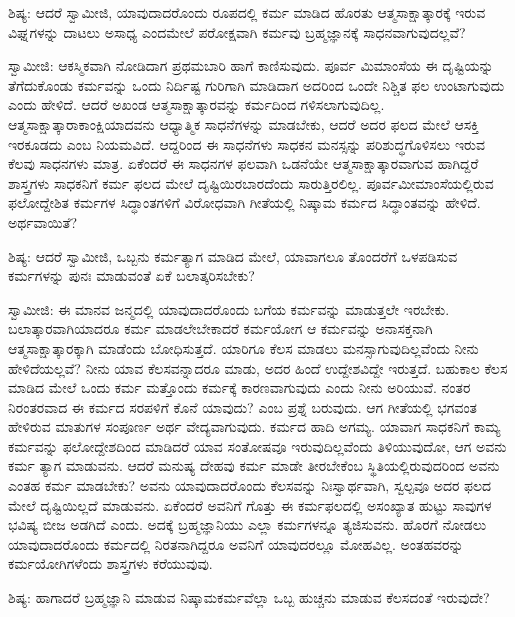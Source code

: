 ಶಿಷ್ಯ: ಆದರೆ ಸ್ವಾಮೀಜಿ, ಯಾವುದಾದರೊಂದು ರೂಪದಲ್ಲಿ ಕರ್ಮ ಮಾಡಿದ ಹೊರತು ಆತ್ಮಸಾಕ್ಷಾತ್ಕಾರಕ್ಕೆ ಇರುವ ವಿಘ್ನಗಳನ್ನು ದಾಟಲು ಅಸಾಧ್ಯ ಎಂದಮೇಲೆ ಪರೋಕ್ಷವಾಗಿ ಕರ್ಮವು ಬ್ರಹ್ಮಜ್ಞಾನಕ್ಕೆ ಸಾಧನವಾಗುವುದಲ್ಲವೆ?

ಸ್ವಾಮೀಜಿ: ಆಕಸ್ಮಿಕವಾಗಿ ನೋಡಿದಾಗ ಪ್ರಥಮಬಾರಿ ಹಾಗೆ ಕಾಣಿಸುವುದು. ಪೂರ್ವ ಮಿಮಾಂಸೆಯ ಈ ದೃಷ್ಟಿಯನ್ನು ತೆಗೆದುಕೊಂಡು ಕರ್ಮವನ್ನು ಒಂದು ನಿರ್ದಿಷ್ಟ ಗುರಿಗಾಗಿ ಮಾಡಿದಾಗ ಅದರಿಂದ ಒಂದೇ ನಿಶ್ಚಿತ ಫಲ ಉಂಟಾಗುವುದು ಎಂದು ಹೇಳಿದೆ. ಆದರೆ ಅಖಂಡ ಆತ್ಮಸಾಕ್ಷಾತ್ಕಾರವನ್ನು ಕರ್ಮದಿಂದ ಗಳಿಸಲಾಗುವುದಿಲ್ಲ. ಆತ್ಮಸಾಕ್ಷಾತ್ಕಾರಾಕಾಂಕ್ಷಿಯಾದವನು ಆಧ್ಯಾತ್ಮಿಕ ಸಾಧನೆಗಳನ್ನು ಮಾಡಬೇಕು, ಆದರೆ ಅದರ ಫಲದ ಮೇಲೆ ಆಸಕ್ತಿ ಇರಕೂಡದು ಎಂಬ ನಿಯಮವಿದೆ. ಆದ್ದರಿಂದ ಈ ಸಾಧನೆಗಳು ಸಾಧಕನ ಮನಸ್ಸನ್ನು ಪರಿಶುದ್ಧಗೊಳಿಸಲು ಇರುವ ಕೆಲವು ಸಾಧನಗಳು ಮಾತ್ರ. ಏಕೆಂದರೆ ಈ ಸಾಧನಗಳ ಫಲವಾಗಿ ಒಡನೆಯೇ ಆತ್ಮಸಾಕ್ಷಾತ್ಕಾರವಾಗುವ ಹಾಗಿದ್ದರೆ ಶಾಸ್ತ್ರಗಳು ಸಾಧಕನಿಗೆ ಕರ್ಮ ಫಲದ ಮೇಲೆ ದೃಷ್ಟಿಯಿರಬಾರದೆಂದು ಸಾರುತ್ತಿರಲಿಲ್ಲ. ಪೂರ್ವಮೀಮಾಂಸೆಯಲ್ಲಿರುವ ಫಲೋದ್ದೇಶಿತ ಕರ್ಮಗಳ ಸಿದ್ಧಾಂತಗಳಿಗೆ ವಿರೋಧವಾಗಿ ಗೀತೆಯಲ್ಲಿ ನಿಷ್ಕಾಮ ಕರ್ಮದ ಸಿದ್ಧಾಂತವನ್ನು ಹೇಳಿದೆ. ಅರ್ಥವಾಯಿತೆ?

ಶಿಷ್ಯ: ಆದರೆ ಸ್ವಾಮೀಜಿ, ಒಬ್ಬನು ಕರ್ಮತ್ಯಾಗ ಮಾಡಿದ ಮೇಲೆ, ಯಾವಾಗಲೂ ತೊಂದರೆಗೆ ಒಳಪಡಿಸುವ ಕರ್ಮಗಳನ್ನು ಪುನಃ ಮಾಡುವಂತೆ ಏಕೆ ಬಲಾತ್ಕರಿಸಬೇಕು?

ಸ್ವಾಮೀಜಿ: ಈ ಮಾನವ ಜನ್ಮದಲ್ಲಿ ಯಾವುದಾದರೊಂದು ಬಗೆಯ ಕರ್ಮವನ್ನು ಮಾಡುತ್ತಲೇ ಇರಬೇಕು. ಬಲಾತ್ಕಾರವಾಗಿಯಾದರೂ ಕರ್ಮ ಮಾಡಲೇಬೇಕಾದರೆ ಕರ್ಮಯೋಗ ಆ ಕರ್ಮವನ್ನು ಅನಾಸಕ್ತನಾಗಿ ಆತ್ಮಸಾಕ್ಷಾತ್ಕಾರಕ್ಕಾಗಿ ಮಾಡೆಂದು ಬೋಧಿಸುತ್ತದೆ. ಯಾರಿಗೂ ಕೆಲಸ ಮಾಡಲು ಮನಸ್ಸಾಗುವುದಿಲ್ಲವೆಂದು ನೀನು ಹೇಳಿದೆಯಲ್ಲವೆ? ನೀನು ಯಾವ ಕೆಲಸವನ್ನಾದರೂ ಮಾಡು, ಅದರ ಹಿಂದೆ ಉದ್ದೇಶವಿದ್ದೇ ಇರುತ್ತದೆ. ಬಹುಕಾಲ ಕೆಲಸ ಮಾಡಿದ ಮೇಲೆ ಒಂದು ಕರ್ಮ ಮತ್ತೊಂದು ಕರ್ಮಕ್ಕೆ ಕಾರಣವಾಗುವುದು ಎಂದು ನೀನು ಅರಿಯುವೆ. ನಂತರ ನಿರಂತರವಾದ ಈ ಕರ್ಮದ ಸರಪಳಿಗೆ ಕೊನೆ ಯಾವುದು? ಎಂಬ ಪ್ರಶ್ನೆ ಬರುವುದು. ಆಗ ಗೀತೆಯಲ್ಲಿ ಭಗವಂತ ಹೇಳಿರುವ ಮಾತುಗಳ ಸಂಪೂರ್ಣ ಅರ್ಥ ವೇದ್ಯವಾಗುವುದು. ಕರ್ಮದ ಹಾದಿ ಅಗಮ್ಯ. ಯಾವಾಗ ಸಾಧಕನಿಗೆ ಕಾಮ್ಯ ಕರ್ಮವನ್ನು ಫಲೋದ್ದೇಶದಿಂದ ಮಾಡಿದರೆ ಯಾವ ಸಂತೋಷವೂ ಇರುವುದಿಲ್ಲವೆಂದು ತಿಳಿಯುವುದೋ, ಆಗ ಅವನು ಕರ್ಮ ತ್ಯಾಗ ಮಾಡುವನು. ಆದರೆ ಮನುಷ್ಯ ದೇಹವು ಕರ್ಮ ಮಾಡೇ ತೀರಬೇಕೆಂಬ ಸ್ಥಿತಿಯಲ್ಲಿರುವುದರಿಂದ ಅವನು ಎಂತಹ ಕರ್ಮ ಮಾಡಬೇಕು? ಅವನು ಯಾವುದಾದರೊಂದು ಕೆಲಸವನ್ನು ನಿಃಸ್ವಾರ್ಥವಾಗಿ, ಸ್ವಲ್ಪವೂ ಅದರ ಫಲದ ಮೇಲೆ ದೃಷ್ಟಿಯಿಲ್ಲದೆ ಮಾಡುವನು. ಏಕೆಂದರೆ ಅವನಿಗೆ ಗೊತ್ತು ಈ ಕರ್ಮಫಲದಲ್ಲಿ ಅಸಂಖ್ಯಾತ ಹುಟ್ಟು ಸಾವುಗಳ ಭವಿಷ್ಯ ಬೀಜ ಅಡಗಿದೆ ಎಂದು. ಅದಕ್ಕೆ ಬ್ರಹ್ಮಜ್ಞಾನಿಯು ಎಲ್ಲಾ ಕರ್ಮಗಳನ್ನೂ ತ್ಯಜಿಸುವನು. ಹೊರಗೆ ನೋಡಲು ಯಾವುದಾದರೊಂದು ಕರ್ಮದಲ್ಲಿ ನಿರತನಾಗಿದ್ದರೂ ಅವನಿಗೆ ಯಾವುದರಲ್ಲೂ ಮೋಹವಿಲ್ಲ. ಅಂತಹವರನ್ನು ಕರ್ಮಯೋಗಿಗಳೆಂದು ಶಾಸ್ತ್ರಗಳು ಕರೆಯುವುವು.

ಶಿಷ್ಯ: ಹಾಗಾದರೆ ಬ್ರಹ್ಮಜ್ಞಾನಿ ಮಾಡುವ ನಿಷ್ಕಾಮಕರ್ಮವೆಲ್ಲಾ ಒಬ್ಬ ಹುಚ್ಚನು ಮಾಡುವ ಕೆಲಸದಂತೆ ಇರುವುದೇ?

